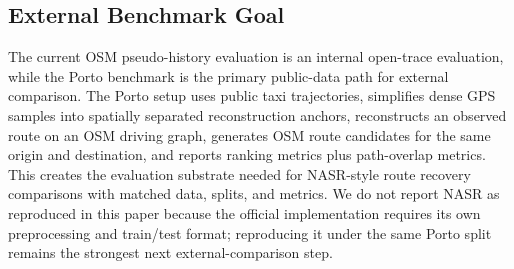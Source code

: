 \subsection{External Benchmark Goal}
The current OSM pseudo-history evaluation is an internal open-trace evaluation, while the Porto benchmark is the primary public-data path for external comparison. The Porto setup uses public taxi trajectories, simplifies dense GPS samples into spatially separated reconstruction anchors, reconstructs an observed route on an OSM driving graph, generates OSM route candidates for the same origin and destination, and reports ranking metrics plus path-overlap metrics. This creates the evaluation substrate needed for NASR-style route recovery comparisons with matched data, splits, and metrics. We do not report NASR as reproduced in this paper because the official implementation requires its own preprocessing and train/test format; reproducing it under the same Porto split remains the strongest next external-comparison step.
